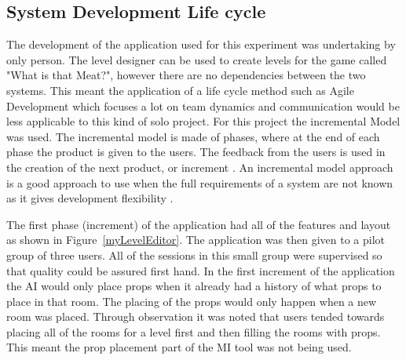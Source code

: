\documentclass[journal]{IEEEtran}
\begin{document}
\subsection{System Development Life cycle}
The development of the application used for this experiment was undertaking by only person. The level designer can be used to create levels for the game called "What is that Meat?", however there are no dependencies between the two systems. This meant the application of a life cycle method such as Agile Development which focuses a lot on team dynamics and communication\cite{agile} would be less applicable to this kind of solo project. For this project the incremental Model was used. The incremental model is made of phases, where at the end of each phase the product is given to the users. The feedback from the users is used in the creation of the next product, or increment \cite{massey2012comparing}. An incremental model approach is a good approach to use when the full requirements of a system are not known as it gives development flexibility \cite{isaias2015information}. 

The first phase (increment) of the application had all of the features and layout as shown in Figure~\ref{myLevelEditor}. The application was then given to a pilot group of three users. All of the sessions in this small group were supervised so that quality could be assured first hand. In the first increment of the application the AI would only place props when it already had a history of what props to place in that room. The placing of the props would only happen when a new room was placed. Through observation it was noted that users tended towards placing all of the rooms for a level first and then filling the rooms with props. This meant the prop placement part of the MI tool was not being used. 
\end{document}
